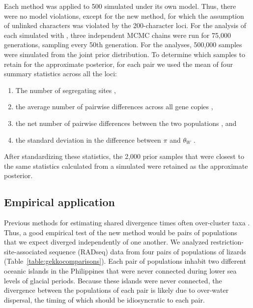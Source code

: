 Each method was applied to 500 \datasets simulated under its own model.
Thus, there were no model violations, except for the new method, for which the
assumption of unlinked characters was violated by the 200-character loci.
For the analysis of each simulated \dataset with \ecoevolity, three independent
MCMC chains were run for 75,000 generations, sampling every 50th generation.
For the \dppmsbayes analyses, 500,000 samples were simulated from the joint
prior distribution.
To determine which samples to retain for the approximate posterior, for each
pair we used the mean of four summary statistics across all the loci:
\begin{enumerate}
    \item The number of segregating sites \citep[$\theta_W$;][]{Watterson1975},
    \item the average number of pairwise differences across all gene copies
        \citep[$\pi$;][]{NeiLi1979},
    \item the net number of pairwise differences between the two populations
        \citep[Equation 25 in][]{NeiLi1979}, and
    \item the standard deviation in the difference between $\pi$ and $\theta_W$
        \citep{Tajima1989}.
\end{enumerate}
After standardizing these statistics, the 2,000 prior samples that were closest
to the same statistics calculated from a simulated \dataset were retained as
the approximate posterior.

\subsection{Empirical application}
Previous methods for estimating shared divergence times often over-cluster taxa
\citep{Oaks2012,Oaks2014reply}.
Thus, a good empirical test of the new method would be pairs of populations
that we expect diverged independently of one another.
We analyzed restriction-site-associated sequence (RADseq) data from four pairs
of populations of  lizards
(Table~\ref{table:gekkocomparisons}).
Each pair of populations inhabit two different oceanic islands in the
Philippines that were never connected during lower sea levels of glacial
periods.
Because these islands were never connected, the divergence between the
populations of each pair is likely due to over-water dispersal, the timing of
which should be idiosyncratic to each pair.
   


